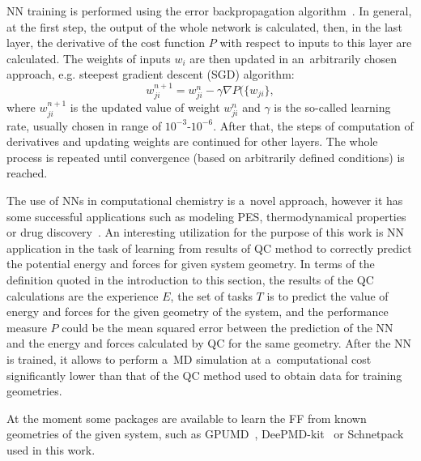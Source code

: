 NN training is performed using the error backpropagation algorithm~\cite{bishop-machine-learning, geron-machine-learning}. In general, at the first step, the output of the whole network is calculated, then, in the last layer, the derivative of the cost function $P$ with respect to inputs to this layer are calculated. The weights of inputs $w_i$ are then updated in an~arbitrarily chosen approach, e.g. steepest gradient descent (SGD) algorithm:
\begin{equation}
    w_{ji}^{n + 1} = w_{ji}^{n} - \gamma \nabla P(\{ w_{ji} \},
\end{equation}
where $w_{ji}^{n + 1}$ is the updated value of weight $w_{ji}^{n}$ and $\gamma$ is the so-called learning rate, usually chosen in range of $10^{-3}$-$10^{-6}$. After that, the steps of computation of derivatives and updating weights are continued for other layers. The whole process is repeated until convergence (based on arbitrarily defined conditions) is reached.

The use of NNs in computational chemistry is a~novel approach, however it has some successful applications such as modeling PES, thermodynamical properties~\cite{machine-learning-chemistry-review-1} or drug discovery~\cite{machine-learning-chemistry-review-2}. An interesting utilization for the purpose of this work is NN application in the task of learning from results of QC method to correctly predict the potential energy and forces for given system geometry. In terms of the definition quoted in the introduction to this section, the results of the QC calculations are the experience $E$, the set of tasks $T$ is to predict the value of energy and forces for the given geometry of the system, and the performance measure $P$ could be the mean squared error between the prediction of the NN and the energy and forces calculated by QC for the same geometry. After the NN is trained, it allows to perform a~MD simulation at a~computational cost significantly lower than that of the QC method used to obtain data for training geometries.

At the moment some packages are available to learn the FF from known geometries of the given system, such as GPUMD~\cite{gpumd}, DeePMD-kit~\cite{deepmdkit} or Schnetpack~\cite{schnetpack} used in this work.